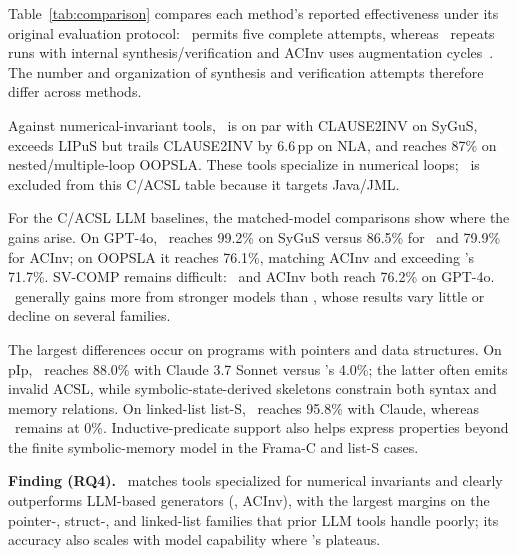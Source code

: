 {Table~\ref{tab:comparison} compares each method's reported effectiveness under its original evaluation protocol: \toolname\ permits five complete attempts, whereas \autospec\ repeats runs with internal synthesis/verification and ACInv uses augmentation cycles~\cite{autospec,Enhancing_Automated_Loop_Invariant_Generation_for_Complex_Programs_with_Large_Language_Models}. The number and organization of synthesis and verification attempts therefore differ across methods.}

Against numerical-invariant tools, \toolname\ is on par with CLAUSE2INV on
SyGuS, exceeds LIPuS but trails CLAUSE2INV by 6.6\,pp on NLA, and reaches
87\% on nested/multiple-loop OOPSLA. These tools specialize in numerical
loops; \specgen\ is excluded from this C/ACSL table because it targets
Java/JML.

For the C/ACSL LLM baselines, the matched-model comparisons show where the
gains arise. On GPT-4o, \toolname\ reaches 99.2\% on SyGuS versus 86.5\% for
\autospec\ and 79.9\% for ACInv; on OOPSLA it reaches 76.1\%, matching ACInv
and exceeding \autospec's 71.7\%. SV-COMP remains difficult: \toolname\ and
ACInv both reach 76.2\% on GPT-4o. \toolname\ generally gains more from
stronger models than \autospec, whose results vary little or decline on
several families.

The largest differences occur on programs with pointers and data structures.
On pIp, \toolname\ reaches 88.0\% with Claude 3.7 Sonnet versus \autospec's
4.0\%; the latter often emits invalid ACSL, while symbolic-state-derived
skeletons constrain both syntax and memory relations. On linked-list list-S,
\toolname\ reaches 95.8\% with Claude, whereas \autospec\ remains at 0\%.
Inductive-predicate support also helps express properties beyond the finite
symbolic-memory model in the Frama-C and list-S cases.

\begin{finding}
\textbf{Finding (RQ4).} \toolname\ matches tools specialized for numerical invariants and clearly outperforms LLM-based generators (\autospec, ACInv), with the largest margins on the pointer-, struct-, and linked-list families that prior LLM tools handle poorly; its accuracy also scales with model capability where \autospec's plateaus.
\end{finding}






